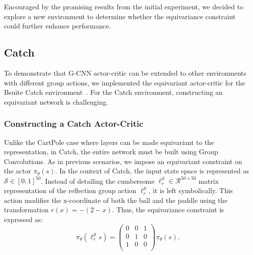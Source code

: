 Encouraged by the promising results from the initial experiment, we decided to explore a new environment to determine whether the equivariance constraint could further enhance performance.

\subsection{Catch}\label{sec:catch_ac}
To demonstrate that G-CNN actor-critic can be extended to other environments with different group actions, we implemented the equivariant actor-critic for the Bsuite Catch environment~\cite{osband2020bsuite}. For the Catch environment, constructing an equivariant network is challenging.

\subsubsection{Constructing a Catch Actor-Critic}
Unlike the CartPole case where layers can be made equivariant to the
representation, in Catch, the entire network must be built using Group Convolutions. As in previous scenarios, we impose an equivariant constraint on the actor $\pi_\theta(s)$.
In the context of Catch, the input state space is represented as $\mathcal{S} \in [0, 1]^{50}$. Instead of detailing the cumbersome $\ell_r^\mathcal{S} \in \mathcal{R}^{50 \times 50}$ matrix representation of the reflection group action $\ell_r^\mathcal{S}$, it is left symbolically. This action modifies the x-coordinate of both the ball and the paddle using the transformation $r(x)=-(2-x)$. Thus, the equivariance constraint is expressed as:
\begin{equation}
	\pi_\theta(\ell_r^\mathcal{S} s) = \begin{pmatrix}
		0 & 0 & 1 \\
		0 & 1 & 0 \\
		1 & 0 & 0 \\
	\end{pmatrix}\pi_\theta(s).
\end{equation}
